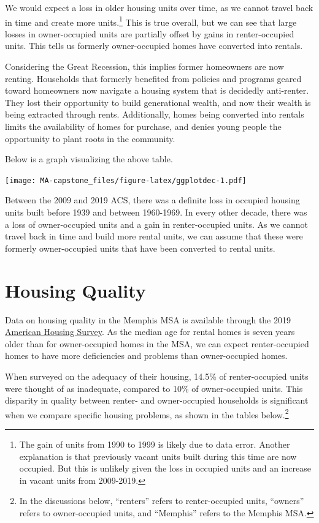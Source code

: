 \documentclass[
]{book}
\begin{document}
We would expect a loss in older housing units over time, as we cannot travel back in time and create more units.\footnote{The gain of units from 1990 to 1999 is likely due to data error. Another explanation is that previously vacant units built during this time are now occupied. But this is unlikely given the loss in occupied units and an increase in vacant units from 2009-2019.} This is true overall, but we can see that large losses in owner-occupied units are partially offset by gains in renter-occupied units. This tells us formerly owner-occupied homes have converted into rentals.

Considering the Great Recession, this implies former homeowners are now renting. Households that formerly benefited from policies and programs geared toward homeowners now navigate a housing system that is decidedly anti-renter. They lost their opportunity to build generational wealth, and now their wealth is being extracted through rents. Additionally, homes being converted into rentals limits the availability of homes for purchase, and denies young people the opportunity to plant roots in the community.

Below is a graph visualizing the above table.

\texttt{[image: MA-capstone\_files/figure-latex/ggplotdec-1.pdf]}

Between the 2009 and 2019 ACS, there was a definite loss in occupied housing units built before 1939 and between 1960-1969. In every other decade, there was a loss of owner-occupied units and a gain in renter-occupied units. As we cannot travel back in time and build more rental units, we can assume that these were formerly owner-occupied units that have been converted to rental units.

\hypertarget{housing-quality}{%
\section{Housing Quality}\label{housing-quality}}

Data on housing quality in the Memphis MSA is available through the 2019 \href{https://www.census.gov/programs-surveys/ahs.html}{American Housing Survey}. As the median age for rental homes is seven years older than for owner-occupied homes in the MSA, we can expect renter-occupied homes to have more deficiencies and problems than owner-occupied homes.

When surveyed on the adequacy of their housing, 14.5\% of renter-occupied units were thought of as inadequate, compared to 10\% of owner-occupied units. This disparity in quality between renter- and owner-occupied households is significant when we compare specific housing problems, as shown in the tables below.\footnote{In the discussions below, ``renters'' refers to renter-occupied units, ``owners'' refers to owner-occupied units, and ``Memphis'' refers to the Memphis MSA.}
\end{document}
